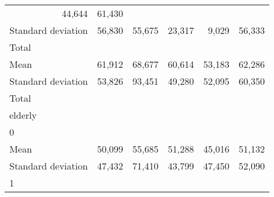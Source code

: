 \begin{tabular}{llllll}
  \multicolumn{1}{r}{44,644} &
  \multicolumn{1}{r}{61,430} \\
\multicolumn{1}{l}{\hspace{4em}Standard deviation} &
  \multicolumn{1}{|r}{56,830} &
  \multicolumn{1}{r}{55,675} &
  \multicolumn{1}{r}{23,317} &
  \multicolumn{1}{r}{9,029} &
  \multicolumn{1}{r}{56,333} \\
\multicolumn{1}{l}{\hspace{3em}Total} &
  \multicolumn{1}{|r}{} &
  \multicolumn{1}{r}{} &
  \multicolumn{1}{r}{} &
  \multicolumn{1}{r}{} &
  \multicolumn{1}{r}{} \\
\multicolumn{1}{l}{\hspace{4em}Mean} &
  \multicolumn{1}{|r}{61,912} &
  \multicolumn{1}{r}{68,677} &
  \multicolumn{1}{r}{60,614} &
  \multicolumn{1}{r}{53,183} &
  \multicolumn{1}{r}{62,286} \\
\multicolumn{1}{l}{\hspace{4em}Standard deviation} &
  \multicolumn{1}{|r}{53,826} &
  \multicolumn{1}{r}{93,451} &
  \multicolumn{1}{r}{49,280} &
  \multicolumn{1}{r}{52,095} &
  \multicolumn{1}{r}{60,350} \\
\multicolumn{1}{l}{\hspace{1em}Total} &
  \multicolumn{1}{|r}{} &
  \multicolumn{1}{r}{} &
  \multicolumn{1}{r}{} &
  \multicolumn{1}{r}{} &
  \multicolumn{1}{r}{} \\
\multicolumn{1}{l}{\hspace{2em}elderly} &
  \multicolumn{1}{|r}{} &
  \multicolumn{1}{r}{} &
  \multicolumn{1}{r}{} &
  \multicolumn{1}{r}{} &
  \multicolumn{1}{r}{} \\
\multicolumn{1}{l}{\hspace{3em}0} &
  \multicolumn{1}{|r}{} &
  \multicolumn{1}{r}{} &
  \multicolumn{1}{r}{} &
  \multicolumn{1}{r}{} &
  \multicolumn{1}{r}{} \\
\multicolumn{1}{l}{\hspace{4em}Mean} &
  \multicolumn{1}{|r}{50,099} &
  \multicolumn{1}{r}{55,685} &
  \multicolumn{1}{r}{51,288} &
  \multicolumn{1}{r}{45,016} &
  \multicolumn{1}{r}{51,132} \\
\multicolumn{1}{l}{\hspace{4em}Standard deviation} &
  \multicolumn{1}{|r}{47,432} &
  \multicolumn{1}{r}{71,410} &
  \multicolumn{1}{r}{43,799} &
  \multicolumn{1}{r}{47,450} &
  \multicolumn{1}{r}{52,090} \\
\multicolumn{1}{l}{\hspace{3em}1} &
  \multicolumn{1}{|r}{} &

\end{tabular}
